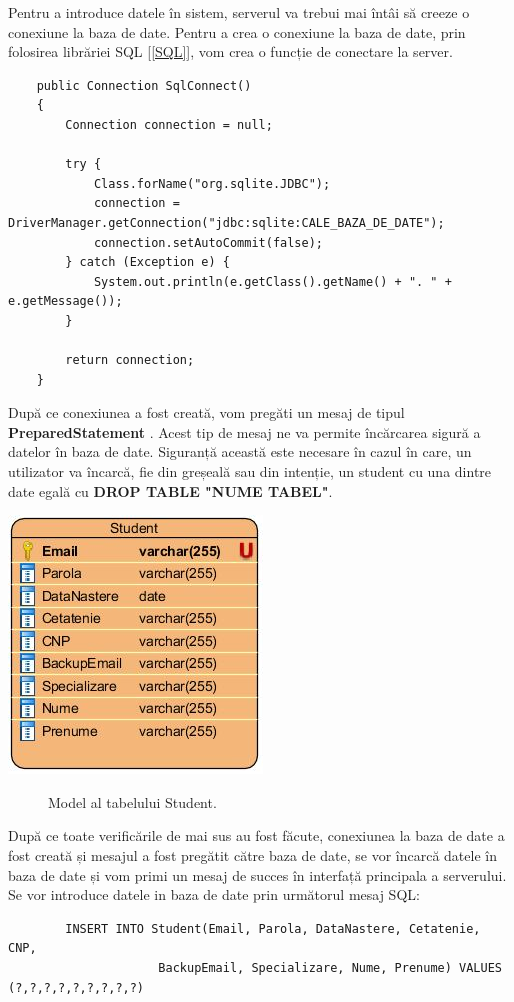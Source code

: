 \documentclass{article}
\begin{document}
		Pentru a introduce datele în sistem, serverul va trebui mai întâi să creeze o conexiune la baza de date. Pentru a crea o conexiune la baza de date, prin folosirea librăriei SQL [\ref{SQL}], vom crea o funcție de conectare la server.

	\begin{verbatim}
    public Connection SqlConnect()
    {
        Connection connection = null;

        try {
            Class.forName("org.sqlite.JDBC");
            connection = DriverManager.getConnection("jdbc:sqlite:CALE_BAZA_DE_DATE");
            connection.setAutoCommit(false);
        } catch (Exception e) {
            System.out.println(e.getClass().getName() + ". " + e.getMessage());
        }

        return connection;
    }
	\end{verbatim}\label{Conectare}

		După ce conexiunea a fost creată, vom pregăti un mesaj de tipul \textbf{PreparedStatement} . Acest tip de mesaj ne va permite încărcarea sigură a datelor în baza de date. Siguranță această este necesare în cazul în care, un utilizator va încarcă, fie din greșeală sau din intenție, un student cu una dintre date egală cu \textbf{DROP TABLE "NUME TABEL"}. 

	\begin{center}
		\includegraphics[scale=0.6]{Source/Student}\label{Student}
		\begin{figure}[!h]
			{\caption*{Model al tabelului Student.}}
		\end{figure}
	\end{center}

		După ce toate verificările de mai sus au fost făcute, conexiunea la baza de date a fost creată și mesajul a fost pregătit către baza de date, se vor încarcă datele în baza de date și vom primi un mesaj de succes în interfață principala a serverului. Se vor introduce datele in baza de date prin următorul mesaj SQL: 
	\begin{verbatim}
		INSERT INTO Student(Email, Parola, DataNastere, Cetatenie, CNP, 
                     BackupEmail, Specializare, Nume, Prenume) VALUES (?,?,?,?,?,?,?,?,?)
	\end{verbatim}
 
\end{document}
